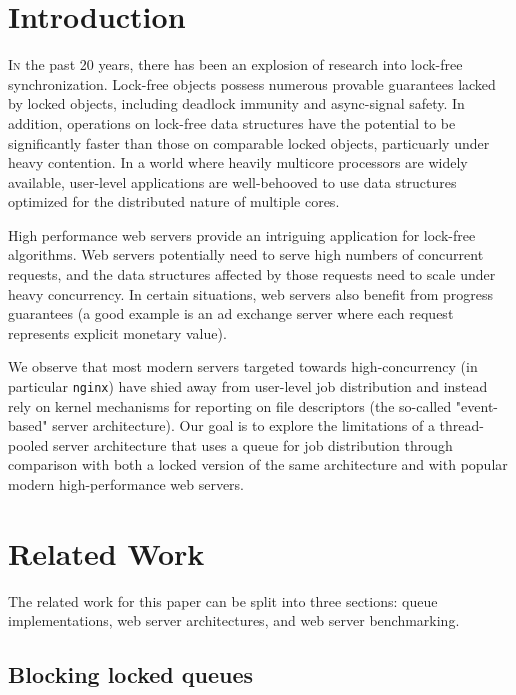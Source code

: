 \documentclass[twoside,10pt]{article}
\begin{document}
\begin{multicols}{2}
 
\section{Introduction}

\lettrine[nindent=0em,lines=3]{I}n the past 20 years, there has been
an explosion of research into lock-free synchronization. Lock-free
objects possess numerous provable guarantees lacked by locked objects,
including deadlock immunity and async-signal safety. In addition,
operations on lock-free data structures have the potential to be
significantly faster than those on comparable locked objects,
particuarly under heavy contention. In a world where heavily multicore
processors are widely available, user-level applications are
well-behooved to use data structures optimized for the distributed
nature of multiple cores.
  
High performance web servers provide an intriguing application for
lock-free algorithms. Web servers potentially need to serve high
numbers of concurrent requests, and the data structures affected by
those requests need to scale under heavy concurrency. In certain
situations, web servers also benefit from progress guarantees (a good
example is an ad exchange server where each request represents
explicit monetary value).

We observe that most modern servers targeted towards high-concurrency
(in particular \verb+nginx+) have shied away from user-level job
distribution and instead rely on kernel mechanisms for reporting on
file descriptors (the so-called "event-based" server
architecture). Our goal is to explore the limitations of a
thread-pooled server architecture that uses a queue for job
distribution through comparison with both a locked version of the same
architecture and with popular modern high-performance web servers.

\section{Related Work}

The related work for this paper can be split into three sections:
queue implementations, web server architectures, and web
server benchmarking.

\subsection{Blocking locked queues}


\end{multicols}
\end{document}
